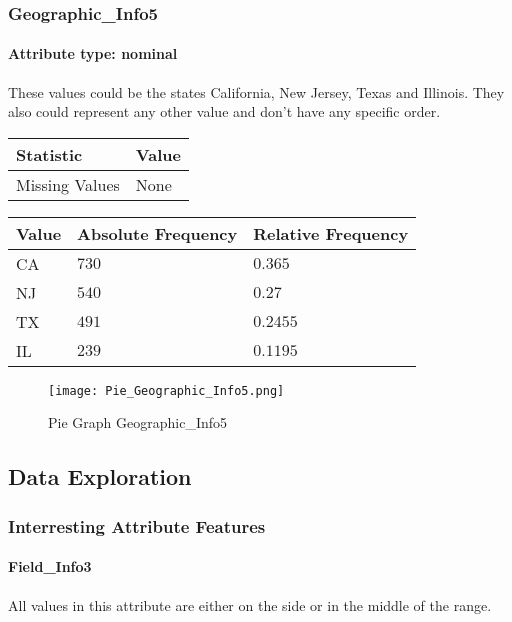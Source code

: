 \subsubsection{Geographic\_Info5}
\paragraph{Attribute type: nominal} These values could be the states California, New Jersey, Texas and Illinois. They also could represent any other value and don't have any specific order.

\begin{table}[H]
	\renewcommand{\arraystretch}{1.25}
	\begin{tabular}{l|l}
		\textbf{Statistic} & \textbf{Value}\\\hline
		Missing Values& None\\\hline
	\end{tabular}
\end{table}
\begin{table}[H]
	\renewcommand{\arraystretch}{1.25}
	\begin{tabular}{l|l|l}
		\textbf{Value} & \textbf{Absolute Frequency} & \textbf{Relative Frequency}\\\hline
		CA&$730$&$0.365$\\\hline
		NJ&$540$&$0.27$\\\hline
		TX&$491$&$0.2455$\\\hline
		IL&$239$&$0.1195$
	\end{tabular}
\end{table}

\begin{figure}[H]
	\begin{center}
		\texttt{[image: Pie\_Geographic\_Info5.png]}
	\end{center}
	\caption{Pie Graph Geographic\_Info5}
\end{figure}

\subsection{Data Exploration}

\subsubsection{Interresting Attribute Features}

\paragraph{Field\_Info3} All values in this attribute are either on the side or in the middle of the range. 

